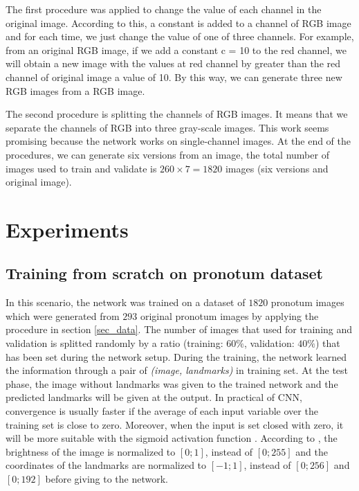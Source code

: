 \documentclass[10pt]{article}
\begin{document}
The first procedure was applied to change the value of each
channel in the original image. According to this, a constant is
added to a channel of RGB image and for each time, we just
change the value of one of three channels. For example, from
an original RGB image, if we add a constant c = 10 to the
red channel, we will obtain a new image with the values at
red channel by greater than the red channel of original image
a value of 10. By this way, we can generate three new RGB
images from a RGB image.

The second procedure is splitting the channels of RGB
images. It means that we separate the channels of RGB into
three gray-scale images. This work seems promising because
the network works on single-channel images. At the end of the procedures, we
can generate six versions from an image, the total number of
images used to train and validate is $260 \times 7 = 1820$ images
(six versions and original image).

\section{Experiments}
\subsection{Training from scratch on pronotum dataset}
\label{sectrain1}
In this scenario, the network was trained on a dataset of $1820$ pronotum images which were generated from $293$ original pronotum images by applying the procedure in section \ref{sec_data}. The number of images that
used for training and validation is splitted randomly by a ratio
(training: $60\%$, validation: $40\%$) that has been set during the
network setup. During the training, the network learned the information through a pair of \textit{(image, landmarks)} in training set. At the test phase, the image without landmarks was given to the trained network and the predicted landmarks will be given at the output. In practical of CNN, convergence is
usually faster if the average of each input variable over the
training set is close to zero. Moreover, when the input is set
closed with zero, it will be more suitable with the sigmoid
activation function \cite{lecun2012efficient}. According to \cite{lecun2012efficient}, the brightness of
the image is normalized to $[0; 1]$, instead of $[0; 255]$ and the
coordinates of the landmarks are normalized to $[-1; 1]$, instead
of $[0; 256]$ and $[0; 192]$ before giving to the network.
\end{document}
